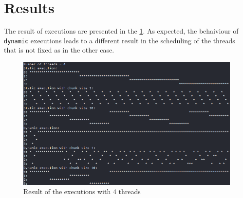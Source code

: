 \documentclass[]{scrartcl}
\begin{document}
\section{Results}
 The result of executions are presented in the \ref{fig_1}.
 As expected, the behaiviour of \texttt{dynamic} executions leads to a different result in the scheduling of the threads that is not fixed as in the other case. 
 \begin{figure}[h!]
 	\begin{centering}
 		\includegraphics[scale=.5]{img_ex2}
 		\caption{Result of the executions with 4 threads}
 		\label{fig_1}
 	\end{centering}
 \end{figure} 
\end{document}
